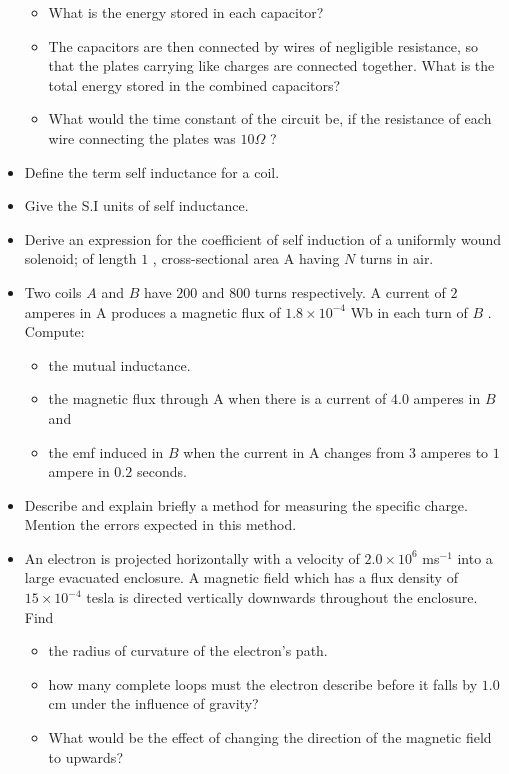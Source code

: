 \documentclass{article}
\begin{document}
\begin{itemize}
 \begin{itemize}
\item What is the energy stored in each capacitor?
\item The capacitors are then connected by wires of negligible resistance, so that the plates carrying like charges are connected together. What is the total energy stored in the combined capacitors?
\item What would the time constant of the circuit be, if the resistance of each wire connecting the plates was $ 10\Omega $ ?
\end{itemize}
\item Define the term self inductance for a coil.
\item Give the S.I units of self inductance.
\item Derive an expression for the coefficient of self induction of a uniformly wound solenoid; of length $ 1$ , cross-sectional area A having $ N$ turns in air.
\item Two coils $ A$ and $ B$ have $ 200$ and $ 800$ turns respectively. A current of $ 2$ amperes in A produces a magnetic flux of $ 1.8 \times 10^{-4}$ Wb in each turn of $ B$ . Compute:
 \begin{itemize}
\item the mutual inductance.
\item the magnetic flux through A when there is a current of $ 4.0$ amperes in $ B$ and
\item the emf induced in $ B$ when the current in A changes from $ 3$ amperes to $ 1$ ampere in $ 0.2$ seconds.
\end{itemize}
\item Describe and explain briefly a method for measuring the specific charge. Mention the errors expected in this method.
\item An electron is projected horizontally with a velocity of $ 2.0 \times 10^{6}$ ms$ ^{-1}$ into a large evacuated enclosure. A magnetic field which has a flux density of $ 15 \times 10^{-4}$ tesla is directed vertically downwards throughout the enclosure. Find
 \begin{itemize}
\item the radius of curvature of the electron's path.
\item how many complete loops must the electron describe before it falls by $ 1.0$ cm under the influence of gravity?
\item What would be the effect of changing the direction of the magnetic field to upwards?
\end{itemize}

\end{itemize}
\end{document}
